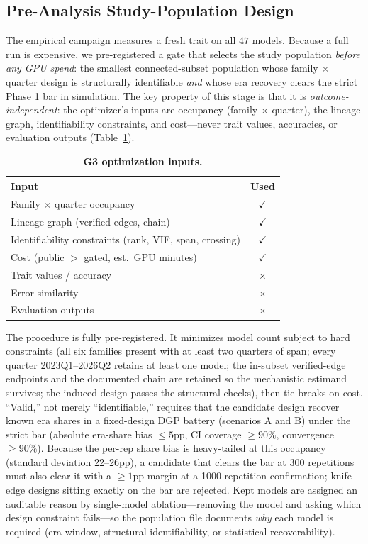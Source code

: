 \documentclass{ieeeaccess}
\theoremstyle{definition}
\theoremstyle{plain}
\begin{document}
\subsection{Pre-Analysis Study-Population Design}
\label{sec:g3}
The empirical campaign measures a fresh trait on all $47$ models. Because a full
run is expensive, we pre-registered a gate that selects the study population
\emph{before any GPU spend}: the smallest connected-subset population whose
family $\times$ quarter design is structurally identifiable \emph{and} whose era
recovery clears the strict Phase 1 bar in simulation. The key property of this
stage is that it is \emph{outcome-independent}: the optimizer's inputs are
occupancy (family $\times$ quarter), the lineage graph, identifiability
constraints, and cost---never trait values, accuracies, or evaluation outputs
(Table~\ref{tab:g3inputs}).

\begin{table}[t]
\caption{\textbf{G3 optimization inputs.}}
\label{tab:g3inputs}
\setlength{\tabcolsep}{4pt}
\begin{tabular}{|l|c|}
\hline
Input & Used \\
\hline
Family $\times$ quarter occupancy & $\checkmark$ \\
Lineage graph (verified edges, chain) & $\checkmark$ \\
Identifiability constraints (rank, VIF, span, crossing) & $\checkmark$ \\
Cost (public $>$ gated, est.\ GPU minutes) & $\checkmark$ \\
Trait values / accuracy & $\times$ \\
Error similarity & $\times$ \\
Evaluation outputs & $\times$ \\
\hline
\end{tabular}
\end{table}

The procedure is fully pre-registered. It minimizes model count subject to hard
constraints (all six families present with at least two quarters of span; every
quarter 2023Q1--2026Q2 retains at least one model; the in-subset verified-edge
endpoints and the documented chain are retained so the mechanistic estimand
survives; the induced design passes the structural checks), then tie-breaks on
cost. ``Valid,'' not merely ``identifiable,'' requires that the candidate design
recover known era shares in a fixed-design DGP battery (scenarios A and B) under
the strict bar (absolute era-share bias $\le5$pp, CI coverage $\ge90\%$,
convergence $\ge90\%$). Because the per-rep share bias is heavy-tailed at this
occupancy (standard deviation 22--26pp), a candidate that clears the bar at 300
repetitions must also clear it with a $\ge1$pp margin at a 1000-repetition
confirmation; knife-edge designs sitting exactly on the bar are rejected. Kept
models are assigned an auditable reason by single-model ablation---removing the
model and asking which design constraint fails---so the population file documents
\emph{why} each model is required (era-window, structural
identifiability, or statistical recoverability).
\end{document}

